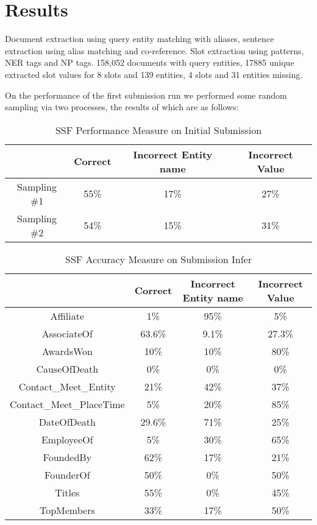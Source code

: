 
\section{Results}


Document extraction using query entity matching with aliases, sentence 
extraction using alias matching and co-reference. Slot extraction using 
patterns, NER tags and NP tags. 158,052 documents with query entities, 17885 
unique extracted slot values for 8 slots and 139 entities, 4 slots and 31 
entities missing.

On the performance of the first submission run we performed some random 
sampling via two processes, the results of which are as follows:

\begin{table}[b]
\caption{SSF Performance Measure on Initial Submission }
\centering
\begin{tabular}{|c|c|c|c|}
\hline 
 & Correct & Incorrect Entity name & Incorrect Value \\ 
\hline 
Sampling \#1 & 55\% & 17\% & 27\% \\ 
\hline Sampling \#2 & 54\% & 15\% & 31\%  \\ 
\hline 
\end{tabular} 
\end{table}

\begin{table}
\caption{SSF Accuracy Measure on Submission Infer }
\centering
\begin{tabular}{|c|c|c|c|}
\hline 
 & Correct & Incorrect Entity name & Incorrect Value \\ 
\hline 
Affiliate & 1\% & 95\% & 5\% \\ \hline 
AssociateOf & 63.6\% & 9.1\% & 27.3\%  \\ \hline 
AwardsWon & 10\% & 10\% & 80\%  \\ \hline 
CauseOfDeath & 0\% & 0\% & 0\%  \\ \hline 
Contact\_Meet\_Entity & 21\% & 42\% & 37\%  \\ \hline 
Contact\_Meet\_PlaceTime & 5\% & 20\% & 85\%  \\ \hline 
DateOfDeath & 29.6\% & 71\% & 25\%  \\ \hline 
EmployeeOf & 5\% & 30\% & 65\%  \\ \hline 
FoundedBy & 62\% & 17\% & 21\%  \\ \hline 
FounderOf & 50\% & 0\% & 50\%  \\ \hline 
Titles & 55\% & 0\% & 45\%  \\ \hline 
TopMembers & 33\% & 17\% & 50\%  \\ \hline 

\end{tabular} 
\end{table}







